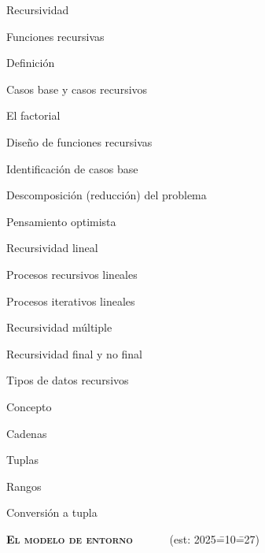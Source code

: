 \begin{longenum}
\begin{longenum}
        \item Recursividad \opcional\
        \begin{longenum}
            \item Funciones recursivas
            \begin{longenum}
                \item Definición
                \item Casos base y casos recursivos
                \item El factorial
                \item Diseño de funciones recursivas
                \begin{longenum}
                    \item Identificación de casos base
                    \item Descomposición (reducción) del problema
                    \item Pensamiento optimista
                \end{longenum}
                \item Recursividad lineal
                \begin{longenum}
                    \item Procesos recursivos lineales \opcional\
                    \item Procesos iterativos lineales \opcional\
                \end{longenum}
                \item Recursividad múltiple
                \item Recursividad final y no final \opcional\
            \end{longenum}
            \item Tipos de datos recursivos
            \begin{longenum}
                \item Concepto
                \item Cadenas
                \item Tuplas
                \item Rangos
                \item Conversión a tupla
            \end{longenum}
        \end{longenum}
    \end{longenum}
    \item \textbf{\textsc{El modelo de entorno}} \ \ \ \ \ \ (est: 2025\==10\==27)

\end{longenum}
